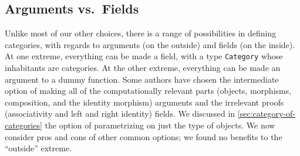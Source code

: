\documentclass[runningheads]{llncs}
\begin{document}
  \subsection{Arguments vs.~Fields} \label{sec:arguments-vs-fields}

    Unlike most of our other choices, there is a range of possibilities in defining categories, with regards to arguments (on the outside) and fields (on the inside).  At one extreme, everything can be made a field, with a type \texttt{Category} whose inhabitants are categories.  At the other extreme, everything can be made an argument to a dummy function.  Some authors \cite{spitters2010developing} have chosen the intermediate option of making all of the computationally relevant parts (objects, morphisms, composition, and the identity morphism) arguments and the irrelevant proofs (associativity and left and right identity) fields.  We discussed in \autoref{sec:category-of-categories} the option of parametrizing on just the type of objects.  We now consider pros and cons of other common options; we found no benefits to the ``outside'' extreme.
    
\end{document}
